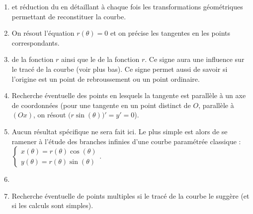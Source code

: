 \documentclass[class=report,crop=false]{standalone}
\begin{document}
\begin{enumerate}
  \item {} et réduction du 
en détaillant à chaque fois les transformations géométriques permettant de reconstituer la courbe.

\item {} On résout l'équation $r(\theta)=0$
et on précise les tangentes en les points correspondants.

\item {} de la fonction $r$ ainsi que le  de
la fonction $r$. Ce signe aura une influence sur le tracé
de la courbe (voir plus bas).
Ce signe permet aussi de savoir si l'origine est un point
de rebroussement ou un point ordinaire.

\item {} Recherche éventuelle des points en lesquels
la tangente est
parallèle à un axe de coordonnées (pour une tangente en un point distinct de $O$,
parallèle à $(Ox)$, on résout $\big(r\sin(\theta)\big)'=y'=0$).


\item {} Aucun résultat spécifique
ne sera fait ici. Le plus simple est alors de se ramener à l'étude des branches
infinies d'une courbe paramétrée classique :
$\left\{
\begin{array}{l}
x(\theta) = r(\theta)\cos(\theta)\\
y(\theta) = r(\theta)\sin(\theta)
\end{array}
\right.$.

\item {}


  \item {} Recherche éventuelle de points multiples si le tracé de la
courbe le suggère (et si les calculs sont simples).

\end{enumerate}
\end{document}
